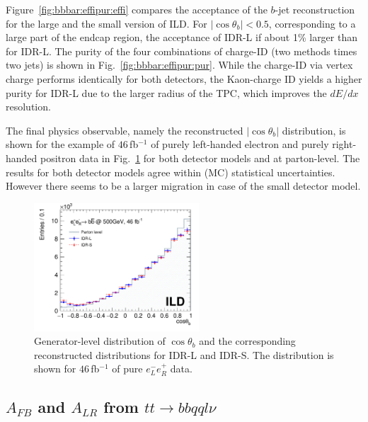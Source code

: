Figure~\ref{fig:bbbar:effipur:effi} compares the acceptance of the $b$-jet reconstruction for the large and the small version of ILD.
For $|\cos{\theta_b}|<0.5$, corresponding to a large part of the endcap 
region, the acceptance of IDR-L if about 1\% larger than for IDR-L. The purity of the four combinations of charge-ID (two methods times two jets) is shown in Fig.~\ref{fig:bbbar:effipur:pur}. While the charge-ID via vertex charge performs identically for both detectors, the Kaon-charge ID yields a higher purity for IDR-L due to the larger radius of the TPC, which improves the $dE/dx$ resolution. 

The final physics observable, namely the reconstructed  $|\cos{\theta_b}|$ distribution, is shown for the example of $46$\,fb$^{-1}$ of purely left-handed electron and purely right-handed positron data in Fig.~\ref{fig:bbbar:result} for both detector models and at parton-level. The results for both detector models agree within (MC) statistical uncertainties. However there seems to be a larger migration in case of the small detector model.


\begin{figure}[htbp]
\begin{center} \includegraphics[width=0.55\textwidth]{Performance/fig/result2models_v3.pdf}
\end{center}
\caption{Generator-level distribution of $\cos{\theta_b}$ and the corresponding reconstructed distributions for IDR-L and IDR-S. The distribution is shown for $46$\,fb$^{-1}$ of pure $e^-_L e^+_R$ data.}
\label{fig:bbbar:result}
\end{figure}

\subsection{\texorpdfstring{$A_{FB}$ and $A_{LR}$ from $tt \to bb qql\nu$}{AFB and ALR from tt -> bbqqlv}}
\label{subsec:bench:ttbar}

